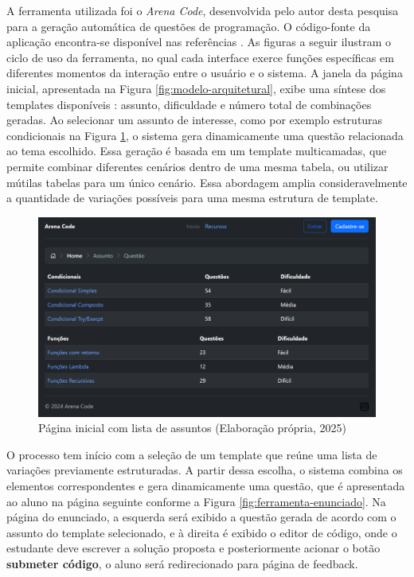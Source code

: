 A ferramenta utilizada foi o \textit{Arena Code}, desenvolvida pelo autor desta pesquisa para a geração automática de questões de programação. O código-fonte da aplicação encontra-se disponível nas referências \parencite{arena-code}.
As figuras a seguir ilustram o ciclo de uso da ferramenta, no qual cada interface exerce funções específicas em diferentes momentos da interação entre o usuário e o sistema. A janela da página inicial, apresentada na Figura \ref{fig:modelo-arquitetural}, exibe uma síntese dos templates disponíveis : assunto, dificuldade e número total de combinações geradas. 
Ao selecionar um assunto de interesse, como por exemplo estruturas condicionais na Figura  \ref{fig:ferramenta-topicos}, o sistema gera dinamicamente uma questão relacionada ao tema escolhido. Essa geração é basada em um template multicamadas, que permite combinar diferentes cenários dentro de uma mesma tabela, ou utilizar mútilas tabelas para um único cenário. Essa abordagem amplia consideravelmente a quantidade de variações possíveis para uma mesma estrutura de template. 
\begin{figure}[H]
  \centering
  \includegraphics[width=\textwidth]{./imagens/capitulo7/ferramenta-fig1}
  \caption{Página inicial com lista de assuntos (Elaboração própria, 2025)}\label{fig:ferramenta-topicos}
\end{figure}


O processo tem início com a seleção de um template que reúne uma lista de variações previamente estruturadas. A partir dessa escolha, o sistema combina os elementos correspondentes e gera dinamicamente uma questão, que é apresentada ao aluno na página seguinte conforme a Figura \ref{fig:ferramenta-enunciado}.  Na página do enunciado, a esquerda será exibido a questão gerada de acordo com o assunto do template selecionado, e à direita é exibido o editor de código, onde o estudante deve escrever a solução proposta e posteriormente acionar o botão \textbf{submeter código}, o aluno será redirecionado para página de feedback. 

